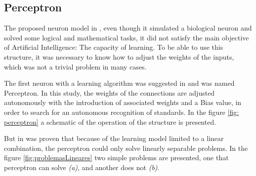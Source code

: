         \subsection{Perceptron} \label{sec: perceptron}
    
            The proposed neuron model in , even though it simulated a biological neuron and solved some logical and mathematical tasks, it did not satisfy the main objective of Artificial Intelligence: The capacity of learning. To be able to use this structure, it was necessary to know how to adjust the weights of the inputs, which was not a trivial problem in many cases. 
                        
            The first neuron with a learning algorithm was suggested in  and was named Perceptron. In this study, the weights of the connections are adjusted autonomously with the introduction of associated weights and a Bias value, in order to search for an autonomous recognition of standards. In the figure \ref{fig: perceptron} a schematic of the operation of the structure is presented.
            
            \begin{figure}[ht]
            \end{figure}
            
            But in  was proven that because of the learning model limited to a linear combination, the perceptron could only solve linearly separable problems. In the figure \ref{fig:problemasLineares} two simple problems are presented, one that perceptron can solve \textit{(a)}, and another does not \textit{(b)}.
            
